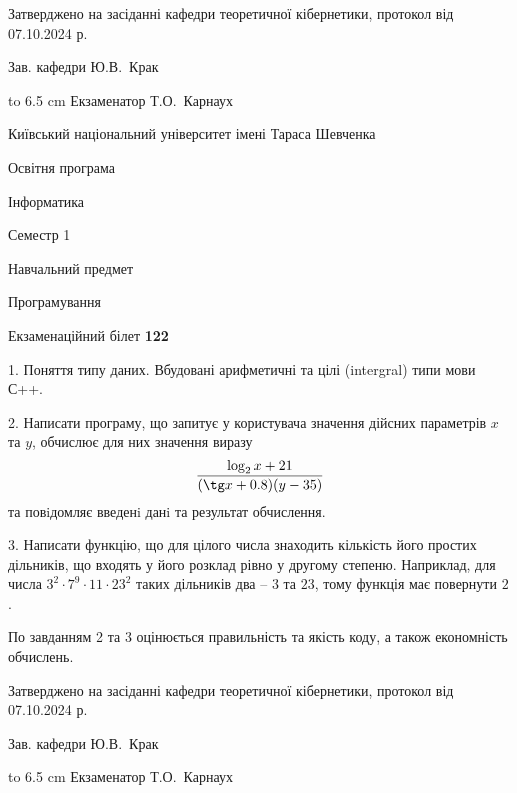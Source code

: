 \documentclass[12pt, ukrainian]{article}
\begin{document}
{\smallskip\smallskip \begin {scriptsize} Затверджено на засіданні кафедри теоретичної кібернетики, протокол   від   07.10.2024 р.\par\smallskip\smallskip\smallskip\smallskip
{\parbox {6.5 cm} {Зав. кафедри \dotfill Ю.В.~Крак}}\hspace {0.7cm} {\hbox to 6.5 cm { Екзаменатор \dotfill Т.О.~Карнаух}} \end{scriptsize}}
\vspace{0.9cm}
{{\begin {scriptsize}\par
{ \center  Київський національний університет імені Тараса Шевченка \par}
{\parbox {5 cm}{Освітня програма \hfill}{\parbox {7 cm}{Інформатика\hfill}}\parbox {6 cm}{\hfill Семестр 1}}\par
{\parbox {5 cm} {Навчальний предмет \hfill}\parbox {7 cm}{Програмування \hfill}\parbox {6cm}{\hfill}\par}\vspace{-15pt} \end{scriptsize}}{\center Екзаменаційний білет \No \textbf { 122 }\par}}
{%
1. Поняття типу даних. Вбудовані арифметичні та цілі (intergral) типи мови С++.%
\par
2. Написати програму, що запитує у користувача значення дійсних параметрів $x$ та $y$, обчислює для них значення виразу 
$$\frac{\log_{2} x + 21}{(\tg x + 0.8) (y - 35)}$$ 
та повiдомляє введенi данi та результат обчислення.

\par
3. Написати функцію, що для цілого числа знаходить кількість його простих дільників, що входять у його розклад рівно у другому степеню. Наприклад, для числа $3^2{\cdot}7^9{\cdot}11{\cdot}23^{2}$ таких дільників два – $3$ та $23$, тому функція має повернути $2$.

По завданням 2 та 3 оцінюється правильність та якість коду, а також економність обчислень.

}
{\smallskip\smallskip \begin {scriptsize} Затверджено на засіданні кафедри теоретичної кібернетики, протокол   від   07.10.2024 р.\par\smallskip\smallskip\smallskip\smallskip
{\parbox {6.5 cm} {Зав. кафедри \dotfill Ю.В.~Крак}}\hspace {0.7cm} {\hbox to 6.5 cm { Екзаменатор \dotfill Т.О.~Карнаух}} \end{scriptsize}}
\end{document}
